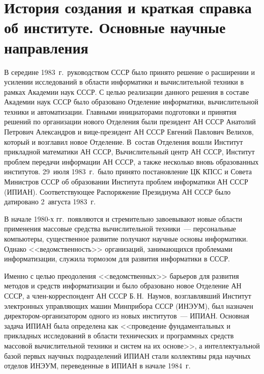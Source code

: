       \begin{multicols}{2}

      \label{st\stat}


\section{История создания и краткая справка об институте.
Основные научные направления}

В середине 1983~г.\ руководством СССР было принято решение о расширении и 
усилении исследований в области информатики и вычислительной техники в рамках 
Академии наук СССР. С целью реализации данного решения в составе Академии наук 
СССР было образовано Отделение информатики, вычислительной техники и 
автоматизации. Главными инициаторами подготовки и принятия решений по 
организации нового Отделения были президент АН СССР Анатолий Петрович 
Александров и ви\-це-пре\-зи\-дент АН СССР Евгений Павлович Велихов, который и 
возглавил новое Отделение. В~состав Отделения вошли Институт прикладной 
математики АН СССР, Вычислительный центр АН СССР, Институт проблем передачи 
информации АН СССР, а также несколько вновь образованных институтов. 29~июля 
1983~г.\ было принято постановление ЦК КПСС и Совета Министров СССР об 
образовании Института проблем информатики АН СССР (ИПИАН). Соответствующее 
Распоряжение Президиума АН СССР было датировано 2~августа 1983~г.

     В начале 1980-х гг.\ появляются и стремительно завоевывают
новые области применения массовые средства вычислительной
техники~--- персональные компьютеры, существенное развитие
получают научные основы информатики. Однако
<<ведомственность>> организаций, занимающихся проблемами
информатизации, служила тормозом для развития информатики в
СССР.

     Именно с целью преодоления <<ведомственных>> барьеров
для развития методов и средств информатизации и было образовано
новое Отделение АН СССР, а член-кор\-рес\-пон\-дент АН СССР Б.\,Н.~Наумов, 
возглавлявший Институт электронных управ\-ля\-ющих
машин Минприбора СССР (ИНЭУМ), был назначен ди\-рек\-то\-ром-ор\-га\-ни\-за\-то\-ром 
одного из новых институтов~--- ИПИАН. Основная
задача ИПИАН была определена как <<проведение
фундаментальных и прикладных исследований в области
технических и программных средств массовой вычислительной
техники и систем на их основе>>, а интеллектуальной базой первых
научных подразделений ИПИАН стали коллективы ряда научных
отделов ИНЭУМ, переведенные в ИПИАН в начале 1984~г.


\end{multicols}
